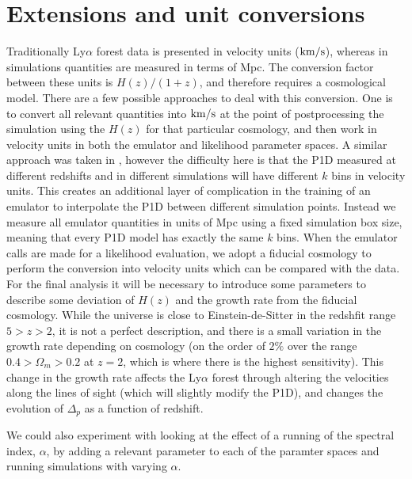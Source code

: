 \documentclass[]{article}
\newcommand{\lyaf}{Ly$\alpha$ forest }                     %
\begin{document}
\section{Extensions and unit conversions}
Traditionally \lyaf data is presented in velocity units ($\rm{km}/s$), whereas in simulations
quantities are measured in terms of Mpc. The conversion factor between these units is $H(z)/(1+z)$,
and therefore requires a cosmological model. There are a few possible approaches to deal
with this conversion. One is to convert all relevant quantities into $\rm{km}/s$ at the point
of postprocessing the simulation using the $H(z)$ for that particular cosmology, and then
work in velocity units in both the emulator and likelihood parameter spaces. A similar
approach was taken in \cite{McDonald2005}, however the difficulty here is that the
P1D measured at different redshifts and in different simulations will have different
$k$ bins in velocity units. This creates an additional layer of complication in the training
of an emulator to interpolate the P1D between different simulation points.
Instead we measure all emulator quantities in units of Mpc using a fixed
simulation box size, meaning that every P1D model has exactly the same $k$ bins. When the
emulator calls are made for a likelihood evaluation, we adopt a fiducial cosmology to
perform the conversion into velocity units which can be compared with the data.
For the final analysis it will be necessary to introduce some parameters to describe
some deviation of $H(z)$ and the growth rate from the fiducial cosmology.
While the universe is close to
Einstein-de-Sitter in the redshfit range $5>z>2$, it is not a perfect description,
and there is a small variation in the growth rate depending on cosmology (on the order of
$2\%$ over the range $0.4>\Omega_m > 0.2$ at $z=2$, which is where there is the highest
sensitivity). This change in the growth rate affects the \lyaf through altering the
velocities along the lines of sight (which will slightly modify the P1D), and changes
the evolution of $\Delta_p$ as a function of redshift.

We could also experiment with looking at the effect of a running of the spectral index,
$\alpha$, by adding a relevant parameter to each of the paramter spaces and running simulations
with varying $\alpha$.
\end{document}
